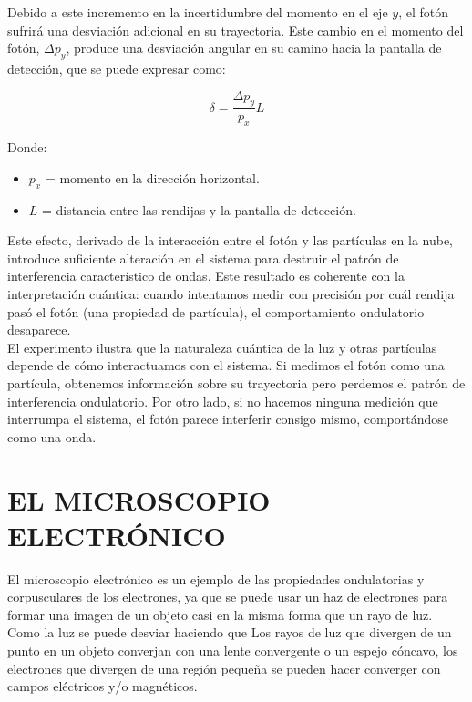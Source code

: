 \documentclass[a4paper]{article}
\begin{document}
    \indent Debido a este incremento en la incertidumbre del momento en el eje $y$, el fotón sufrirá una desviación adicional en su trayectoria. Este cambio en el momento del fotón, $\Delta p_y$, produce una desviación angular en su camino hacia la pantalla de detección, que se puede expresar como:

    \begin{equation}
        \delta = \frac{\Delta p_y}{p_x} L \tag*{}
    \end{equation}

    \indent Donde: \\

      \begin{itemize} [itemsep = -1.5em, topsep = 0em, leftmargin = 1cm]
        \item $p_x$ = momento en la dirección horizontal. \\
        \item $L$ = distancia entre las rendijas y la pantalla de detección. \\
      \end{itemize}

    \indent Este efecto, derivado de la interacción entre el fotón y las partículas en la nube, introduce suficiente alteración en el sistema para destruir el patrón de interferencia característico de ondas. Este resultado es coherente con la interpretación cuántica: cuando intentamos medir con precisión por cuál rendija pasó el fotón (una propiedad de partícula), el comportamiento ondulatorio desaparece.\\

    \indent El experimento ilustra que la naturaleza cuántica de la luz y otras partículas depende de cómo interactuamos con el sistema. Si medimos el fotón como una partícula, obtenemos información sobre su trayectoria pero perdemos el patrón de interferencia ondulatorio. Por otro lado, si no hacemos ninguna medición que interrumpa el sistema, el fotón parece interferir consigo mismo, comportándose como una onda.


\section{EL MICROSCOPIO ELECTRÓNICO}

    \indent El microscopio electrónico es un ejemplo de las propiedades ondulatorias y corpusculares de los electrones, ya que se puede usar un haz de electrones para formar una imagen de un objeto casi en la misma forma que un rayo de luz. Como la luz se puede desviar haciendo que Los rayos de luz que divergen de un punto en un objeto converjan con una lente convergente o un espejo cóncavo, los electrones que divergen de una región pequeña se pueden hacer converger con campos eléctricos y/o magnéticos.\\
\end{document}
